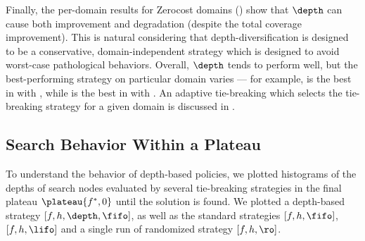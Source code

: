 Finally, the per-domain results for Zerocost domains () show that 
$\depth$ can cause both improvement and degradation (despite the total coverage improvement).
This is natural considering that depth-diversification is designed to be a conservative, domain-independent strategy which is designed to avoid worst-case pathological behaviors.
 Overall,  $\depth$ tends to perform well, but the best-performing strategy on particular domain varies
   --- for example,
 \fifo is the best in  with \lmcut, while
 \lifo is the best in  with \lmcut.
 An adaptive tie-breaking which selects the tie-breaking strategy for a given domain is discussed in .




\subsection{Search Behavior Within a Plateau}

To understand the behavior of depth-based policies, we plotted 
histograms of the depths of search nodes evaluated by several tie-breaking
strategies in the final plateau $\plateau{f^*,0}$ until the solution is
found.  We plotted a depth-based strategy
$[f,h,\depth,\fifo]$, as well as the standard strategies $[f,h,\fifo]$,
$[f,h,\lifo]$ and a single run of randomized strategy $[f,h,\ro]$.

